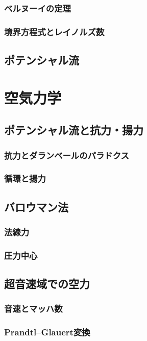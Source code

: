 \documentclass[uplatex,dvipdfmx,a4j,11pt]{jsreport}
\numberwithin{equation}{chapter}
\begin{document}
\subsection{ベルヌーイの定理}


\subsection{境界方程式とレイノルズ数}

\section{ポテンシャル流}

\chapter{空気力学}

\section{ポテンシャル流と抗力・揚力}
\subsection{抗力とダランベールのパラドクス}

\subsection{循環と揚力}

\section{バロウマン法}
\subsection{法線力}
\subsection{圧力中心}


\section{超音速域での空力}
\subsection{音速とマッハ数}

\subsection{Prandtl--Glauert変換}
\end{document}
